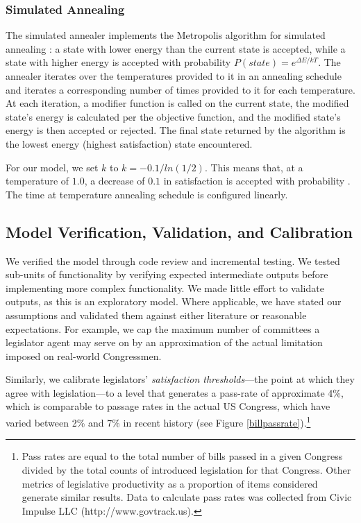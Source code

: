 \documentclass[pdftex,12pt]{llncs}
\begin{document}
\subsubsection{Simulated Annealing}
The simulated annealer implements the Metropolis algorithm for simulated annealing \parencite{mrrt53, kgv}: a state with lower energy than the current state is accepted, while a state with higher energy is accepted with probability $P(state) = e^{\Delta E/kT}$.  
The annealer iterates over the temperatures provided to it in an annealing schedule and iterates a corresponding number of times provided to it for each temperature.  
At each iteration, a modifier function is called on the current state, the modified state's energy is calculated per the objective function, and the modified state's energy is then accepted or rejected.  
The final state returned by the algorithm is the lowest energy (highest satisfaction) state encountered.

For our model, we set $k$ to $k = -0.1/ln(1/2)$.  
This means that, at a temperature of $1.0$, a decrease of $0.1$ in satisfaction is accepted with probability . 
The time at temperature annealing schedule is configured linearly.


\subsection{Model Verification, Validation, and Calibration}
We verified the model through code review and incremental testing.
We tested sub-units of functionality by verifying expected intermediate outputs before implementing more complex functionality.
We made little effort to validate outputs, as this is an exploratory model.  
Where applicable, we have stated our assumptions and validated them against either literature or reasonable expectations.  
For example, we cap the maximum number of committees a legislator agent may serve on by an approximation of the actual limitation imposed on real-world Congressmen.

Similarly, we calibrate legislators' \textit{satisfaction thresholds}---the point at which they agree with legislation---to a level that generates a pass-rate of approximate 4\%, which is comparable to passage rates in the actual US Congress, which have varied between 2\% and 7\% in recent history (see Figure \ref{billpassrate}).\footnote{Pass rates are equal to the total number of bills passed in a given Congress divided by the total counts of introduced legislation for that Congress. Other metrics of legislative productivity as a proportion of items considered generate similar results. Data to calculate pass rates was collected from Civic Impulse LLC (http://www.govtrack.us).\label{passfn}}
\end{document}
